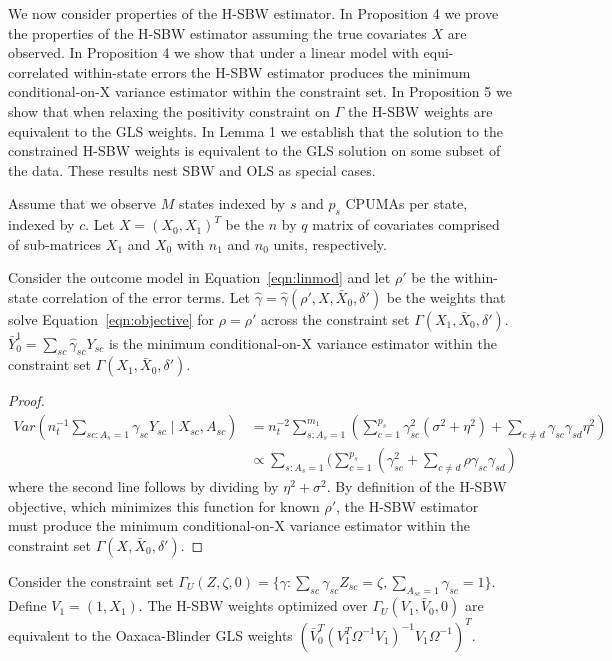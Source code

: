 We now consider properties of the H-SBW estimator. In Proposition 4 we prove the properties of the H-SBW estimator assuming the true covariates $X$ are observed. In Proposition 4 we show that under a linear model with equi-correlated within-state errors the H-SBW estimator produces the minimum conditional-on-X variance estimator within the constraint set. In Proposition 5 we show that when relaxing the positivity constraint on $\Gamma$ the H-SBW weights are equivalent to the GLS weights. In Lemma 1 we establish that the solution to the constrained H-SBW weights is equivalent to the GLS solution on some subset of the data. These results nest SBW and OLS as special cases.

Assume that we observe $M$ states indexed by $s$ and $p_s$ CPUMAs per state, indexed by $c$. Let $X = (X_0, X_1)^T$ be the $n$ by $q$ matrix of covariates comprised of sub-matrices $X_1$ and $X_0$ with $n_1$ and $n_0$ units, respectively.

\begin{proposition}
    Consider the outcome model in Equation~\ref{eqn:linmod} and let $\rho'$ be the within-state correlation of the error terms. Let $\hat{\gamma} = \hat{\gamma}(\rho', X, \bar{X}_0, \delta')$ be the weights that solve Equation~\ref{eqn:objective} for $\rho = \rho'$ across the constraint set $\Gamma(X_1, \bar{X}_0, \delta')$. $\bar{Y}_0^1 = \sum_{sc}\hat{\gamma}_{sc}Y_{sc}$ is the minimum conditional-on-X variance estimator within the constraint set $\Gamma(X_1, \bar{X}_0, \delta')$.
\end{proposition}

\begin{proof}
\begin{align*}
    Var(n_t^{-1}\sum_{sc: A_s = 1}\gamma_{sc}Y_{sc} \mid X_{sc}, A_{sc}) &= n_t^{-2}\sum_{s: A_s = 1}^{m_1}(\sum_{c = 1}^{p_s}\gamma_{sc}^2(\sigma^2 + \eta^2) + \sum_{c \ne d}\gamma_{sc}\gamma_{sd}\eta^2) \\
    &\propto \sum_{s: A_s = 1}(\sum_{c = 1}^{p_s}(\gamma_{sc}^2 + \sum_{c \ne d}\rho \gamma_{sc}\gamma_{sd})
\end{align*}
%
where the second line follows by dividing by $\eta^2 + \sigma^2$. By definition of the H-SBW objective, which minimizes this function for known $\rho'$, the H-SBW estimator must produce the minimum conditional-on-X variance estimator within the constraint set $\Gamma(X, \bar{X}_0, \delta')$.
\end{proof}

\begin{proposition}
    Consider the constraint set $\Gamma_U(Z, \zeta, 0) = \{\gamma: \sum_{sc}\gamma_{sc}Z_{sc} = \zeta, \sum_{A_{sc} = 1}\gamma_{sc} = 1\}$. Define $V_1 = (1, X_1)$. The H-SBW weights optimized over $\Gamma_U(V_1, \bar{V}_0, 0)$ are equivalent to the Oaxaca-Blinder GLS weights $(\bar{V}_0^T(V_1^T\Omega^{-1}V_1)^{-1}V_1\Omega^{-1})^T$. 
\end{proposition}

